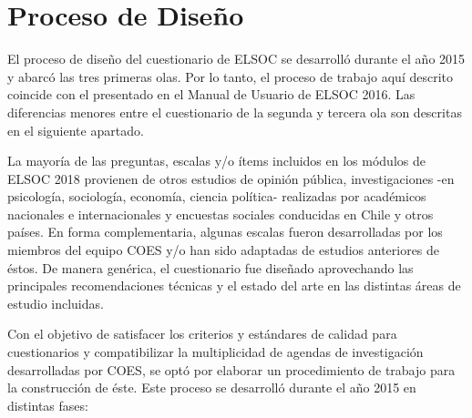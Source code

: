 \documentclass[
  openany]{book}
\begin{document}
\hypertarget{proceso-de-diseuxf1o}{%
\section{Proceso de Diseño}\label{proceso-de-diseuxf1o}}

El proceso de diseño del cuestionario de ELSOC se desarrolló durante el año 2015 y abarcó las tres primeras olas. Por lo tanto, el proceso de trabajo aquí descrito coincide con el presentado en el Manual de Usuario de ELSOC 2016. Las diferencias menores entre el cuestionario de la segunda y tercera ola son descritas en el siguiente apartado.

La mayoría de las preguntas, escalas y/o ítems incluidos en los módulos de ELSOC 2018 provienen de otros estudios de opinión pública, investigaciones -en psicología, sociología, economía, ciencia política- realizadas por académicos nacionales e internacionales y encuestas sociales conducidas en Chile y otros países. En forma complementaria, algunas escalas fueron desarrolladas por los miembros del equipo COES y/o han sido adaptadas de estudios anteriores de éstos. De manera genérica, el cuestionario fue diseñado aprovechando las principales recomendaciones técnicas y el estado del arte en las distintas áreas de estudio incluidas.

Con el objetivo de satisfacer los criterios y estándares de calidad para cuestionarios y compatibilizar la multiplicidad de agendas de investigación desarrolladas por COES, se optó por elaborar un procedimiento de trabajo para la construcción de éste. Este proceso se desarrolló durante el año 2015 en distintas fases:
\end{document}
